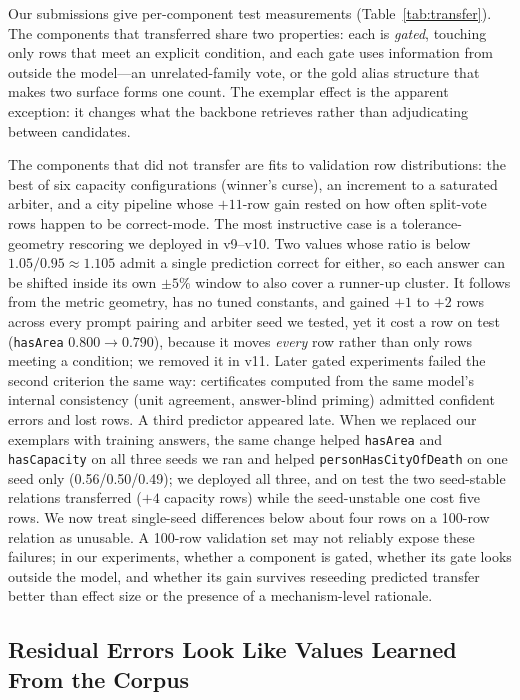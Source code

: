 \documentclass[11pt]{article}
\begin{document}
Our submissions give per-component test measurements
(Table~\ref{tab:transfer}). The components that transferred share two
properties: each is \emph{gated}, touching only rows that meet an
explicit condition, and each gate uses information from outside the
model---an unrelated-family vote, or the gold alias structure that makes
two surface forms one count. The exemplar effect is the apparent
exception: it changes what the backbone retrieves rather than
adjudicating between candidates.

The components that did not transfer are fits to validation row
distributions: the best of six capacity configurations (winner's curse),
an increment to a saturated arbiter, and a city pipeline whose $+11$-row
gain rested on how often split-vote rows happen to be correct-mode. The most instructive case is a tolerance-geometry rescoring
we deployed in v9--v10. Two values whose ratio is below
$1.05/0.95\approx1.105$ admit a single prediction correct for either, so
each answer can be shifted inside its own $\pm5\%$ window to also cover a
runner-up cluster. It follows from the metric geometry, has no tuned
constants, and gained $+1$ to $+2$ rows across every prompt pairing and
arbiter seed we tested, yet it cost a row on test (\texttt{hasArea}
$0.800\rightarrow0.790$), because it moves \emph{every} row rather than
only rows meeting a condition; we removed it in v11. Later gated experiments failed the
second criterion the same way: certificates computed from the same
model's internal consistency (unit agreement, answer-blind priming)
admitted confident errors and lost rows. A third predictor appeared late. When we
replaced our exemplars with training answers, the same change helped
\texttt{hasArea} and \texttt{hasCapacity} on all three seeds we ran and
helped \texttt{personHasCityOfDeath} on one seed only (0.56/0.50/0.49);
we deployed all three, and on test the two seed-stable relations
transferred ($+4$ capacity rows) while the seed-unstable one cost five
rows. We now treat single-seed differences below about four rows on a
100-row relation as unusable. A 100-row validation set may not reliably
expose these failures; in our experiments, whether a component is gated,
whether its gate looks outside the model, and whether its gain survives
reseeding predicted transfer better than effect size or the presence of a
mechanism-level rationale.

\subsection{Residual Errors Look Like Values Learned From the Corpus}
\label{sec:associations}
\end{document}

